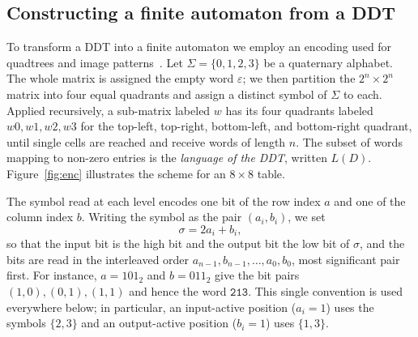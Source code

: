 \documentclass[runningheads]{llncs}
\newcommand{\Sig}{\Sigma}
\newcommand{\re}[1]{\texttt{#1}}
\begin{document}
\subsection{Constructing a finite automaton from a DDT}

To transform a DDT into a finite automaton we employ an encoding used for
quadtrees and image patterns~\cite{quadtree,patterns}. Let $\Sig=\{0,1,2,3\}$ be a
quaternary alphabet. The whole matrix is assigned the empty word $\varepsilon$; we
then partition the $2^{n}\times 2^{n}$ matrix into four equal quadrants and assign
a distinct symbol of $\Sig$ to each. Applied recursively, a sub-matrix labeled
$w$ has its four quadrants labeled $w0,w1,w2,w3$ for the top-left, top-right,
bottom-left, and bottom-right quadrant, until single cells are reached and receive
words of length $n$. The subset of words mapping to non-zero entries is the
\emph{language of the DDT}, written $L(D)$. Figure~\ref{fig:enc} illustrates the
scheme for an $8\times 8$ table.

The symbol read at each level encodes one bit of the row index $a$ and one of the
column index $b$. Writing the symbol as the pair $(a_i,b_i)$, we set
\begin{equation}\label{eq:enc}
  \sigma = 2a_i + b_i,
\end{equation}
so that the input bit is the high bit and the output bit the low bit of $\sigma$,
and the bits are read in the interleaved order $a_{n-1},b_{n-1},\dots,a_0,b_0$,
most significant pair first. For instance, $a=101_2$ and $b=011_2$ give the bit
pairs $(1,0),(0,1),(1,1)$ and hence the word $\re{213}$. This single convention is
used everywhere below; in particular, an input-active position ($a_i=1$) uses the
symbols $\{2,3\}$ and an output-active position ($b_i=1$) uses $\{1,3\}$.
\end{document}
